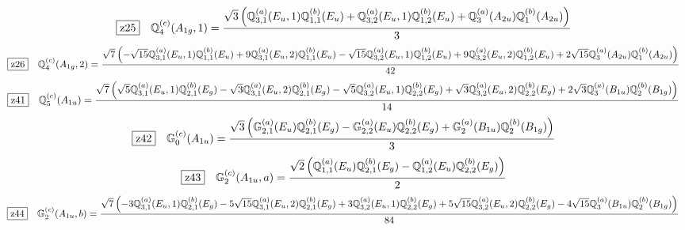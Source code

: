 \documentclass[fleqn,10pt,landscape]{jsarticle}
\begin{document}
\begin{dmath*}
\hspace*{3mm}\fbox{z25}\quad \mathbb{Q}_{4}^{(c)}(A_{1g},1)=\frac{\sqrt{3} \left(\mathbb{Q}_{3,1}^{(a)}(E_{u},1) \mathbb{Q}_{1,1}^{(b)}(E_{u}) + \mathbb{Q}_{3,2}^{(a)}(E_{u},1) \mathbb{Q}_{1,2}^{(b)}(E_{u}) + \mathbb{Q}_{3}^{(a)}(A_{2u}) \mathbb{Q}_{1}^{(b)}(A_{2u})\right)}{3}
\end{dmath*}
\begin{dmath*}
\hspace*{3mm}\fbox{z26}\quad \mathbb{Q}_{4}^{(c)}(A_{1g},2)=\frac{\sqrt{7} \left(- \sqrt{15} \mathbb{Q}_{3,1}^{(a)}(E_{u},1) \mathbb{Q}_{1,1}^{(b)}(E_{u}) + 9 \mathbb{Q}_{3,1}^{(a)}(E_{u},2) \mathbb{Q}_{1,1}^{(b)}(E_{u}) - \sqrt{15} \mathbb{Q}_{3,2}^{(a)}(E_{u},1) \mathbb{Q}_{1,2}^{(b)}(E_{u}) + 9 \mathbb{Q}_{3,2}^{(a)}(E_{u},2) \mathbb{Q}_{1,2}^{(b)}(E_{u}) + 2 \sqrt{15} \mathbb{Q}_{3}^{(a)}(A_{2u}) \mathbb{Q}_{1}^{(b)}(A_{2u})\right)}{42}
\end{dmath*}
\begin{dmath*}
\hspace*{3mm}\fbox{z41}\quad \mathbb{Q}_{5}^{(c)}(A_{1u})=\frac{\sqrt{7} \left(\sqrt{5} \mathbb{Q}_{3,1}^{(a)}(E_{u},1) \mathbb{Q}_{2,1}^{(b)}(E_{g}) - \sqrt{3} \mathbb{Q}_{3,1}^{(a)}(E_{u},2) \mathbb{Q}_{2,1}^{(b)}(E_{g}) - \sqrt{5} \mathbb{Q}_{3,2}^{(a)}(E_{u},1) \mathbb{Q}_{2,2}^{(b)}(E_{g}) + \sqrt{3} \mathbb{Q}_{3,2}^{(a)}(E_{u},2) \mathbb{Q}_{2,2}^{(b)}(E_{g}) + 2 \sqrt{3} \mathbb{Q}_{3}^{(a)}(B_{1u}) \mathbb{Q}_{2}^{(b)}(B_{1g})\right)}{14}
\end{dmath*}
\begin{dmath*}
\hspace*{3mm}\fbox{z42}\quad \mathbb{G}_{0}^{(c)}(A_{1u})=\frac{\sqrt{3} \left(\mathbb{G}_{2,1}^{(a)}(E_{u}) \mathbb{Q}_{2,1}^{(b)}(E_{g}) - \mathbb{G}_{2,2}^{(a)}(E_{u}) \mathbb{Q}_{2,2}^{(b)}(E_{g}) + \mathbb{G}_{2}^{(a)}(B_{1u}) \mathbb{Q}_{2}^{(b)}(B_{1g})\right)}{3}
\end{dmath*}
\begin{dmath*}
\hspace*{3mm}\fbox{z43}\quad \mathbb{G}_{2}^{(c)}(A_{1u},a)=\frac{\sqrt{2} \left(\mathbb{Q}_{1,1}^{(a)}(E_{u}) \mathbb{Q}_{2,1}^{(b)}(E_{g}) - \mathbb{Q}_{1,2}^{(a)}(E_{u}) \mathbb{Q}_{2,2}^{(b)}(E_{g})\right)}{2}
\end{dmath*}
\begin{dmath*}
\hspace*{3mm}\fbox{z44}\quad \mathbb{G}_{2}^{(c)}(A_{1u},b)=\frac{\sqrt{7} \left(- 3 \mathbb{Q}_{3,1}^{(a)}(E_{u},1) \mathbb{Q}_{2,1}^{(b)}(E_{g}) - 5 \sqrt{15} \mathbb{Q}_{3,1}^{(a)}(E_{u},2) \mathbb{Q}_{2,1}^{(b)}(E_{g}) + 3 \mathbb{Q}_{3,2}^{(a)}(E_{u},1) \mathbb{Q}_{2,2}^{(b)}(E_{g}) + 5 \sqrt{15} \mathbb{Q}_{3,2}^{(a)}(E_{u},2) \mathbb{Q}_{2,2}^{(b)}(E_{g}) - 4 \sqrt{15} \mathbb{Q}_{3}^{(a)}(B_{1u}) \mathbb{Q}_{2}^{(b)}(B_{1g})\right)}{84}
\end{dmath*}
\end{document}
